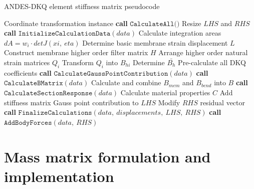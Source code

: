 \begin{algorithm}
	\onehalfspacing
	\caption{ANDES-DKQ element stiffness matrix pseudocode}\label{ANDES-DKQ element stiffness matrix}
	\begin{algorithmic}[1]
		\Require Coordinate transformation instance
		\State \textbf{call} $\texttt{CalculateAll()}$
		\State Resize $LHS$ and $RHS$
		\State \textbf{call} $\texttt{InitializeCalculationData}(data)$
		\State \hspace{\algorithmicindent}Calculate integration areas $dA = w_i \cdot detJ(xi,\ eta)$
		\State \hspace{\algorithmicindent}Determine basic membrane strain displacement $L$
		\State \hspace{\algorithmicindent}Construct membrane higher order filter matrix $H$
		\State \hspace{\algorithmicindent}Arrange higher order natural strain matrices $Q_i$
		\State \hspace{\algorithmicindent}Transform $Q_i$ into $B_{hi}$
		\State \hspace{\algorithmicindent}Determine $\bar{B_h}$
		\State \hspace{\algorithmicindent}Pre-calculate all DKQ coefficients
		\State \textbf{call} $\texttt{CalculateGaussPointContribution}(data)$
		\State \hspace{\algorithmicindent}\textbf{call} $\texttt{CalculateBMatrix}(data)$
		\State \hspace{\algorithmicindent}\hspace{\algorithmicindent} Calculate and combine $B_{mem}$ and $B_{bend}$ into $B$
		\State \hspace{\algorithmicindent}\textbf{call} $\texttt{CalculateSectionResponse}(data)$
		\State \hspace{\algorithmicindent}\hspace{\algorithmicindent} Calculate material properties $C$
		\State \hspace{\algorithmicindent}Add stiffness matrix Gauss point contribution to $LHS$
		\EndWhile
		\State Modify $RHS$ residual vector
		\State \textbf{call} $\texttt{FinalizeCalculations}(data,\ displacements,\ LHS,\ RHS)$
		\State \textbf{call} $\texttt{AddBodyForces}(data,\ RHS)$
	\end{algorithmic}
\end{algorithm}

\section{Mass matrix formulation and implementation}

